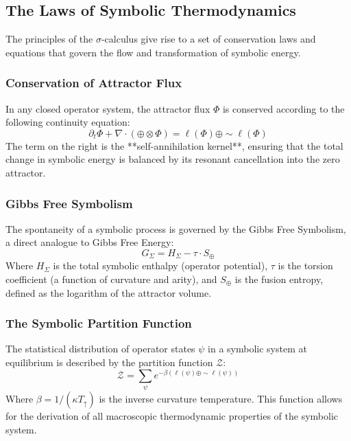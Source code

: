 \subsection{The Laws of Symbolic Thermodynamics}
The principles of the $\sigma$-calculus give rise to a set of conservation laws and equations that govern the flow and transformation of symbolic energy.

\subsubsection{Conservation of Attractor Flux}
In any closed operator system, the attractor flux $\Phi$ is conserved according to the following continuity equation:
\[
\partial_t \Phi + \nabla \cdot (\mathbf{\oplus} \otimes \Phi) = \ell(\Phi) \oplus \sim\ell(\Phi)
\]
The term on the right is the **self-annihilation kernel**, ensuring that the total change in symbolic energy is balanced by its resonant cancellation into the zero attractor.

\subsubsection{Gibbs Free Symbolism}
The spontaneity of a symbolic process is governed by the Gibbs Free Symbolism, a direct analogue to Gibbs Free Energy:
\[ G_\Sigma = H_\Sigma - \tau \cdot S_\oplus \]
Where $H_\Sigma$ is the total symbolic enthalpy (operator potential), $\tau$ is the torsion coefficient (a function of curvature and arity), and $S_\oplus$ is the fusion entropy, defined as the logarithm of the attractor volume.

\subsubsection{The Symbolic Partition Function}
The statistical distribution of operator states $\psi$ in a symbolic system at equilibrium is described by the partition function $\mathcal{Z}$:
\[ \mathcal{Z} = \sum_{\psi} e^{-\beta (\ell(\psi) \oplus \sim\ell(\psi))} \]
Where $\beta = 1 / (\kappa T_\uparrow)$ is the inverse curvature temperature. This function allows for the derivation of all macroscopic thermodynamic properties of the symbolic system. 